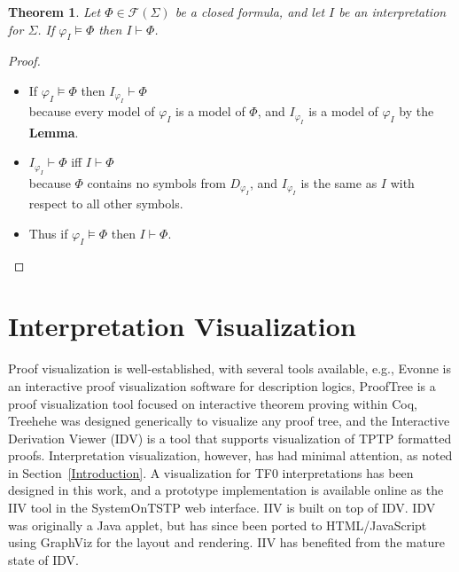 \documentclass[letterpaper]{article}
\newcommand{\smalltt}[1]{\small \texttt{#1}}
\newtheorem*{theorem}{Theorem}
\begin{document}
\begin{theorem}
Let $\Phi \in \mathcal{F}(\Sigma)$ be a closed formula, and let $I$ be an interpretation for
$\Sigma$. 
If $\varphi_I \models \Phi$ then $I \vdash \Phi$.
\end{theorem}
\vspace*{-1em}
\begin{proof}
~\linebreak
\vspace*{-1.5em}
\begin{itemize}
\item If $\varphi_I \models \Phi$ then $I_{\varphi_I} \vdash \Phi$ \\
      because every model of $\varphi_I$ is a model of $\Phi$, and $I_{\varphi_I}$ is a model
      of $\varphi_I$ by the {\bf Lemma}.
\item $I_{\varphi_I} \vdash \Phi$ iff $I \vdash \Phi$ \\
      because $\Phi$ contains no symbols from $D_{\varphi_I}$, and $I_{\varphi_I}$ is the same
      as $I$ with respect to all other symbols.
\item Thus if $\varphi_I \models \Phi$ then $I \vdash \Phi$.
\end{itemize}
\end{proof}

\section{Interpretation Visualization}
\label{Visualization}

Proof visualization is well-established, with several tools available, e.g., 
Evonne \cite{AB+22} is an interactive proof visualization software for description logics,
ProofTree \cite{Tew17} is a proof visualization tool focused on interactive theorem proving within 
Coq,
Treehehe \cite{Bat18} was designed generically to visualize any proof tree,
and
the Interactive Derivation Viewer \cite{TPS07} (IDV) is a tool that supports visualization of 
TPTP formatted proofs.
Interpretation visualization, however, has 
had minimal attention, as noted in Section~\ref{Introduction}. 
A visualization for TF0 interpretations has been designed in this work, and a prototype 
implementation is available online as the IIV tool in the SystemOnTSTP web interface.
IIV is built on top of IDV.
IDV was originally a Java applet, but has since been ported to HTML/JavaScript using GraphViz
\cite{EG+02} for the layout and rendering.
IIV has benefited from the mature state of IDV.
\end{document}
